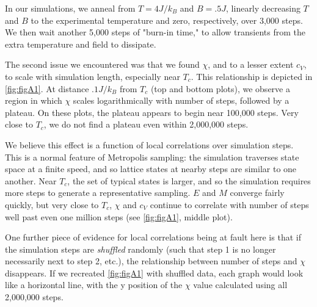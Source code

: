 \documentclass[letter,scriptaddress,twocolumn, prl,nofootinbib]{revtex4}
\begin{document}
In our simulations, we anneal from $T = 4 J/k_B$ and $B = .5 J$, linearly decreasing $T$ and $B$ to the experimental temperature and zero, respectively, over 3,000 steps. We then wait another 5,000 steps of "burn-in time," to allow transients from the extra temperature and field to dissipate.

The second issue we encountered was that we found $\chi$, and to a lesser extent $c_V$, to scale with simulation length, especially near $T_c$. This relationship is depicted in \autoref{fig:figA1}. At distance $.1 J/k_B$ from $T_c$ (top and bottom plots), we observe a region in which $\chi$ scales logarithmically with number of steps, followed by a plateau. On these plots, the plateau appears to begin near 100,000 steps. Very close to $T_c$, we do not find a plateau even within 2,000,000 steps.

We believe this effect is a function of local correlations over simulation steps. This is a normal feature of Metropolis sampling: the simulation traverses state space at a finite speed, and so lattice states at nearby steps are similar to one another. Near $T_c$, the set of typical states is larger, and so the simulation requires more steps to generate a representative sampling. $E$ and $M$ converge fairly quickly, but very close to $T_c$, $\chi$ and $c_V$ continue to correlate with number of steps well past even one million steps (see \autoref{fig:figA1}, middle plot).

One further piece of evidence for local correlations being at fault here is that if the simulation steps are \textit{shuffled} randomly (such that step 1 is no longer necessarily next to step 2, etc.), the relationship between number of steps and $\chi$ disappears. If we recreated \autoref{fig:figA1} with shuffled data, each graph would look like a horizontal line, with the y position of the $\chi$ value calculated using all 2,000,000 steps.
\end{document}
